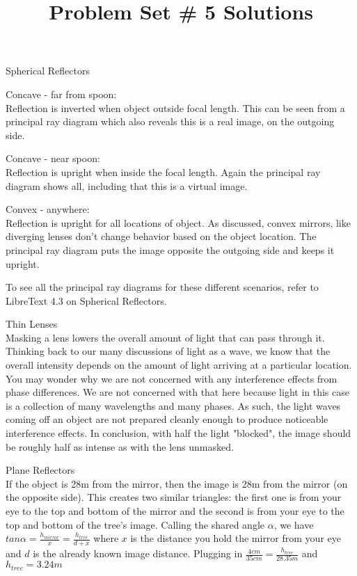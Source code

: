 \documentclass[10pt]{article}
\newenvironment{problem}[2][Problem]{\begin{trivlist}
\item[\hskip \labelsep {\bfseries #1}\hskip \labelsep {\bfseries #2.}]}{\end{trivlist}}
\begin{document}
 \title{Problem Set \# 5 Solutions}
\date{}
\author{}
\maketitle

\begin{problem}{1} Spherical Reflectors\
\item Concave - far from spoon:\\
Reflection is inverted when object outside focal length. This can be seen from a principal ray diagram which also reveals this is a real image, on the outgoing side.
\item Concave - near spoon:\\
Reflection is upright when inside the focal length. Again the principal ray diagram shows all, including that this is a virtual image.
\item Convex - anywhere:\\
Reflection is upright for all locations of object. As discussed, convex mirrors, like diverging lenses don't change behavior based on the object location. The principal ray diagram puts the image opposite the outgoing side and keeps it upright.
\item To see all the principal ray diagrams for these different scenarios, refer to LibreText 4.3 on Spherical Reflectors.
\end{problem}

\begin{problem}{2} Thin Lenses\\
Masking a lens lowers the overall amount of light that can pass through it. Thinking back to our many discussions of light as a wave, we know that the overall intensity depends on the amount of light arriving at a particular location. You may wonder why we are not concerned with any interference effects from phase differences. We are not concerned with that here because light in this case is a collection of many wavelengths and many phases. As such, the light waves coming off an object are not prepared cleanly enough to produce noticeable interference effects. In conclusion, with half the light "blocked", the image should be roughly half as intense as with the lens unmasked.
\end{problem}

\begin{problem}{3} Plane Reflectors\\
If the object is 28m from the mirror, then the image is 28m from the mirror (on the opposite side). This creates two similar triangles: the first one is from your eye to the top and bottom of the mirror and the second is from your eye to the top and bottom of the tree's image. Calling the shared angle $\alpha$, we have $tan\alpha = \frac{h_{mirror}}{x}=\frac{h_{tree}}{d+x}$ where $x$ is the distance you hold the mirror from your eye and $d$ is the already known image distance. Plugging in $\frac{4cm}{35cm}=\frac{h_{tree}}{28.35m}$ and $h_{tree}=3.24m$

\end{problem}
\end{document}
